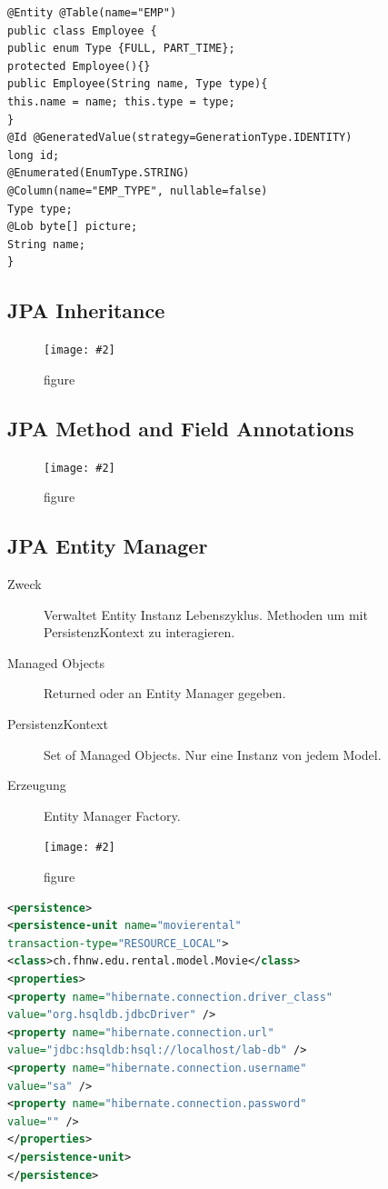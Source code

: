 \documentclass[a4paper,10pt]{scrreprt}
\newcommand{\pic}[2][figure]{\begin{figure}[h]
 \centering
 \texttt{[image: \#2]}
 \caption{#1}
\end{figure}
}
\begin{document}
\begin{lstlisting}[caption=Annotationsbeispiel]
 @Entity @Table(name="EMP")
public class Employee {
public enum Type {FULL, PART_TIME};
protected Employee(){}
public Employee(String name, Type type){
this.name = name; this.type = type;
}
@Id @GeneratedValue(strategy=GenerationType.IDENTITY)
long id;
@Enumerated(EnumType.STRING)
@Column(name="EMP_TYPE", nullable=false)
Type type;
@Lob byte[] picture;
String name;
}
\end{lstlisting}



\subsection{JPA Inheritance}
\pic{jpainherit.png}

\subsection{JPA Method and Field Annotations}
 \pic{mfannot.png}
 
\subsection{JPA Entity Manager}
\begin{description}
 \item [Zweck] Verwaltet Entity Instanz Lebenszyklus. Methoden um mit PersistenzKontext zu interagieren.
 \item [Managed Objects] Returned oder an Entity Manager gegeben.
 \item [PersistenzKontext] Set of Managed Objects. Nur eine Instanz von jedem Model.
 \item [Erzeugung] Entity Manager Factory.
 
\end{description}

\pic{emdiag.png}

\begin{lstlisting}[language=xml,caption=JPA Persistence Unit]
 <persistence>
<persistence-unit name="movierental"
transaction-type="RESOURCE_LOCAL">
<class>ch.fhnw.edu.rental.model.Movie</class>
<properties>
<property name="hibernate.connection.driver_class"
value="org.hsqldb.jdbcDriver" />
<property name="hibernate.connection.url"
value="jdbc:hsqldb:hsql://localhost/lab-db" />
<property name="hibernate.connection.username"
value="sa" />
<property name="hibernate.connection.password"
value="" />
</properties>
</persistence-unit>
</persistence>
\end{lstlisting}
\end{document}
